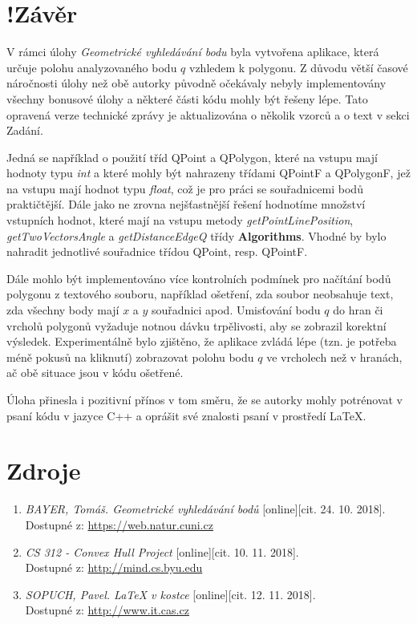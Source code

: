 \documentclass[a4paper, 12pt]{article}
\begin{document}
\clearpage
\section{!Závěr}
V rámci úlohy \textit{Geometrické vyhledávání bodu} byla vytvořena aplikace, která určuje polohu analyzovaného bodu $q$ vzhledem k polygonu. Z důvodu větší časové náročnosti úlohy než obě autorky původně očekávaly nebyly implementovány všechny bonusové úlohy a některé části kódu mohly být řešeny lépe. Tato opravená verze technické zprávy je aktualizována o několik vzorců a o text v sekci Zadání. 

Jedná se například o použití tříd QPoint a QPolygon, které na vstupu mají hodnoty typu \textit{int} a které mohly být nahrazeny třídami QPointF a QPolygonF, jež na vstupu mají hodnot typu \textit{float}, což je pro práci se souřadnicemi bodů praktičtější. Dále jako ne zrovna nejšťastnější řešení hodnotíme množství vstupních hodnot, které mají na vstupu metody \textit{getPointLinePosition}, \textit{getTwoVectorsAngle} a \textit{getDistanceEdgeQ} třídy \textbf{Algorithms}. Vhodné by bylo nahradit jednotlivé souřadnice třídou QPoint, resp. QPointF. 

Dále mohlo být implementováno více kontrolních podmínek pro načítání bodů polygonu z textového souboru, například ošetření, zda soubor neobsahuje text, zda všechny body mají $x$ a $y$ souřadnici apod. Umisťování bodu $q$ do hran či vrcholů polygonů vyžaduje notnou dávku trpělivosti, aby se zobrazil korektní výsledek. Experimentálně bylo zjištěno, že aplikace zvládá lépe (tzn. je potřeba méně pokusů na kliknutí) zobrazovat polohu bodu $q$ ve vrcholech než v hranách, ač obě situace jsou v kódu ošetřené. 

Úloha přinesla i pozitivní přínos v tom směru, že se autorky mohly potrénovat v psaní kódu v jazyce C++ a oprášit své znalosti psaní v prostředí LaTeX.

\clearpage

\section{Zdroje}
\begin{enumerate}
\item  \textsl{BAYER, Tomáš. Geometrické vyhledávání bodů} [online][cit. 24. 10. 2018].\\
Dostupné z: \href{https://web.natur.cuni.cz/~bayertom/images/courses/Adk/adk4.pdf}{https://web.natur.cuni.cz}

\item  \textsl{CS 312 - Convex Hull Project} [online][cit. 10. 11. 2018].\\
Dostupné z: \href{http://mind.cs.byu.edu/courses/312/projects/project2_files/ConvexHull_python.php}{http://mind.cs.byu.edu}

\item  \textsl{SOPUCH, Pavel. LaTeX v kostce} [online][cit. 12. 11. 2018].\\
Dostupné z: \href{http://www.it.cas.cz/manual/latex/}{http://www.it.cas.cz}


\end{enumerate}
\end{document}
